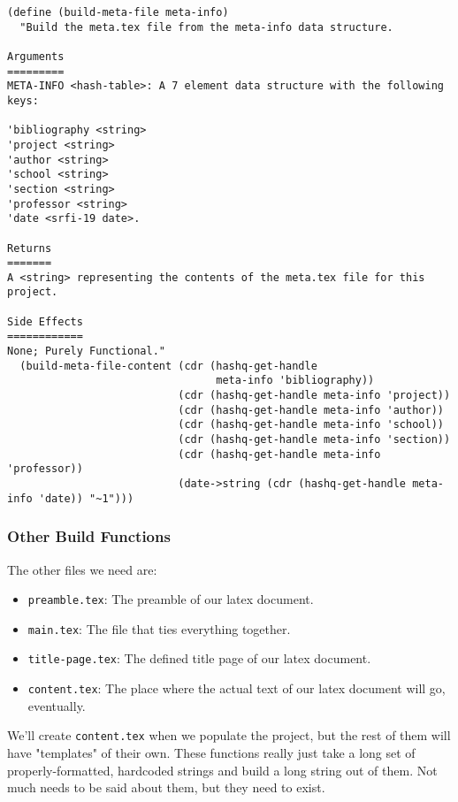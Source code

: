 \documentclass[11pt]{article}
\begin{document}
\begin{verbatim}
(define (build-meta-file meta-info)
  "Build the meta.tex file from the meta-info data structure.

Arguments
=========
META-INFO <hash-table>: A 7 element data structure with the following keys:

'bibliography <string>
'project <string>
'author <string>
'school <string>
'section <string>
'professor <string>
'date <srfi-19 date>.

Returns
=======
A <string> representing the contents of the meta.tex file for this project.

Side Effects
============
None; Purely Functional."
  (build-meta-file-content (cdr (hashq-get-handle
                                 meta-info 'bibliography))
                           (cdr (hashq-get-handle meta-info 'project))
                           (cdr (hashq-get-handle meta-info 'author))
                           (cdr (hashq-get-handle meta-info 'school))
                           (cdr (hashq-get-handle meta-info 'section))
                           (cdr (hashq-get-handle meta-info 'professor))
                           (date->string (cdr (hashq-get-handle meta-info 'date)) "~1")))

\end{verbatim}
\subsubsection{Other Build Functions}
\label{sec:orge492850}
The other files we need are:

\begin{itemize}
\item \texttt{preamble.tex}: The preamble of our latex document.
\item \texttt{main.tex}: The file that ties everything together.
\item \texttt{title-page.tex}: The defined title page of our latex document.
\item \texttt{content.tex}: The place where the actual text of our latex document will go,
eventually.
\end{itemize}

We'll create \texttt{content.tex} when we populate the project, but the rest of them
will have "templates" of their own. These functions really just take a long set
of properly-formatted, hardcoded strings and build a long string out of
them. Not much needs to be said about them, but they need to exist.
\end{document}
